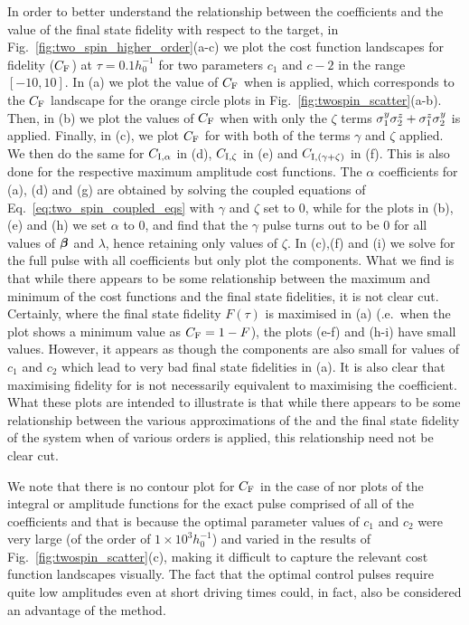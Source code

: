 In order to better understand the relationship between the  coefficients and the value of the final state fidelity with respect to the target, in Fig.~\ref{fig:two_spin_higher_order}(a-c) we plot the cost function landscapes for fidelity ($C_{\rm F}$) at $\tau = 0.1h_0^{-1}$ for two parameters $c_1$ and $c-2$ in the range $[-10, 10]$. In (a) we plot the value of $C_{\rm F}$ when   is applied, which corresponds to the $C_{\rm F}$ landscape for the orange circle plots in Fig.~\ref{fig:twospin_scatter}(a-b). Then, in (b) we plot the values of $C_{\rm F}$ when  with only the $\zeta$ terms $\sigma^y_1\sigma^z_2 + \sigma^z_1\sigma^y_2$ is applied. Finally, in (c), we plot $C_{\rm F}$ for   with both of the  terms $\gamma$ and $\zeta$ applied.  We then do the same for $C_{\rm I, \alpha}$ in (d), $C_{\rm I,\zeta}$ in (e) and $C_{\rm I,(\gamma + \zeta)}$ in (f). This is also done for the respective maximum amplitude cost functions. The $\alpha$ coefficients for (a), (d) and (g) are obtained by solving the coupled equations of Eq.~\eqref{eq:two_spin_coupled_eqs} with $\gamma$ and $\zeta$ set to $0$, while for the plots in (b),(e) and (h) we set $\alpha$ to $0$, and find that the $\gamma$ pulse turns out to be $0$ for all values of $\boldsymbol{\beta}$ and $\lambda$, hence retaining only values of $\zeta$. In (c),(f) and (i) we solve for the full  pulse with all coefficients but only plot the  components. What we find is that while there appears to be some relationship between the maximum and minimum of the  cost functions and the final state fidelities, it is not clear cut. Certainly, where the final state fidelity $F(\tau)$ is maximised in (a) (\@i.e.~when the plot shows a minimum value as $C_{\rm F} = 1 - F$), the   plots (e-f) and (h-i) have small values. However, it appears as though the  components are also small for values of $c_1$ and $c_2$ which lead to very bad final state fidelities in (a). It is also clear that maximising fidelity for   is not necessarily equivalent to maximising the   coefficient. What these plots are intended to illustrate is that while there appears to be some relationship between the various approximations of the  and the final state fidelity of the system when  of various orders is applied, this relationship need not be clear cut.

We note that there is no contour plot for $C_{\rm F}$ in the case of  nor plots of the integral or amplitude functions for the exact  pulse comprised of all of the  coefficients and that is because the optimal parameter values of $c_1$ and $c_2$ were very large (of the order of $1\times10^3 h_0^{-1}$) and varied in the results of Fig.~\ref{fig:twospin_scatter}(c), making it difficult to capture the relevant cost function landscapes visually. The fact that the  optimal control pulses require quite low amplitudes even at short driving times could, in fact, also be considered an advantage of the method.

